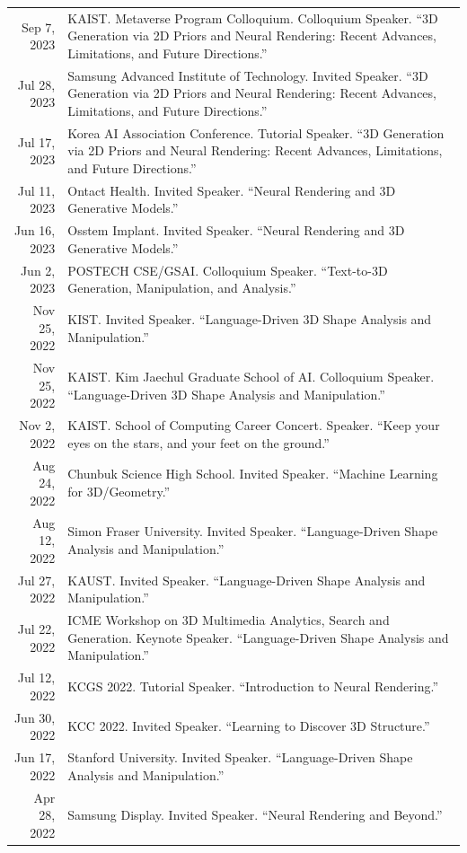 \documentclass[letterpaper,10pt]{article} %
\begin{document}
\begin{xltabular}{\textwidth}{r|X}
Sep 7, 2023 & KAIST. Metaverse Program Colloquium. Colloquium Speaker. ``3D Generation via 2D Priors and Neural Rendering: Recent Advances, Limitations, and Future Directions.''\\
Jul 28, 2023 & Samsung Advanced Institute of Technology. Invited Speaker. ``3D Generation via 2D Priors and Neural Rendering: Recent Advances, Limitations, and Future Directions.''\\
Jul 17, 2023 & Korea AI Association Conference. Tutorial Speaker. ``3D Generation via 2D Priors and Neural Rendering: Recent Advances, Limitations, and Future Directions.''\\
Jul 11, 2023 & Ontact Health. Invited Speaker. ``Neural Rendering and 3D Generative Models.''\\
Jun 16, 2023 & Osstem Implant. Invited Speaker. ``Neural Rendering and 3D Generative Models.''\\
Jun 2, 2023 & POSTECH CSE/GSAI. Colloquium Speaker. ``Text-to-3D Generation, Manipulation, and Analysis.''\\
Nov 25, 2022 & KIST. Invited Speaker. ``Language-Driven 3D Shape Analysis and Manipulation.''\\
Nov 25, 2022 & KAIST. Kim Jaechul Graduate School of AI. Colloquium Speaker. ``Language-Driven 3D Shape Analysis and Manipulation.''\\
Nov 2, 2022 & KAIST. School of Computing Career Concert. Speaker. ``Keep your eyes on the stars, and your feet on the ground.''\\
Aug 24, 2022 & Chunbuk Science High School. Invited Speaker. ``Machine Learning for 3D/Geometry.''\\
Aug 12, 2022 & Simon Fraser University. Invited Speaker. ``Language-Driven Shape Analysis and Manipulation.''\\
Jul 27, 2022 & KAUST. Invited Speaker. ``Language-Driven Shape Analysis and Manipulation.''\\
Jul 22, 2022 & ICME Workshop on 3D Multimedia Analytics, Search and Generation. Keynote Speaker. ``Language-Driven Shape Analysis and Manipulation.''\\
Jul 12, 2022 & KCGS 2022. Tutorial Speaker. ``Introduction to Neural Rendering.''\\
Jun 30, 2022 & KCC 2022. Invited Speaker. ``Learning to Discover 3D Structure.''\\
Jun 17, 2022 & Stanford University. Invited Speaker. ``Language-Driven Shape Analysis and Manipulation.''\\
Apr 28, 2022 & Samsung Display. Invited Speaker. ``Neural Rendering and Beyond.''\\

\end{xltabular}
\end{document}
